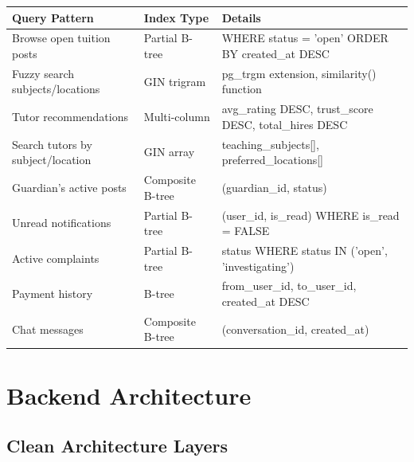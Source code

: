 \documentclass[12pt,a4paper,twoside]{report}
\begin{document}
\begin{longtable}{p{4cm}|p{2.5cm}|p{7cm}}
\toprule
\textbf{Query Pattern} & \textbf{Index Type} & \textbf{Details} \\
\midrule
\endhead
\bottomrule
\endfoot
Browse open tuition posts          & Partial B-tree   & WHERE status = 'open' ORDER BY created\_at DESC \\
Fuzzy search subjects/locations    & GIN trigram       & pg\_trgm extension, similarity() function \\
Tutor recommendations              & Multi-column      & avg\_rating DESC, trust\_score DESC, total\_hires DESC \\
Search tutors by subject/location  & GIN array         & teaching\_subjects[], preferred\_locations[] \\
Guardian's active posts            & Composite B-tree  & (guardian\_id, status) \\
Unread notifications               & Partial B-tree    & (user\_id, is\_read) WHERE is\_read = FALSE \\
Active complaints                  & Partial B-tree    & status WHERE status IN ('open', 'investigating') \\
Payment history                    & B-tree            & from\_user\_id, to\_user\_id, created\_at DESC \\
Chat messages                      & Composite B-tree  & (conversation\_id, created\_at) \\
\bottomrule
\end{longtable}

\chapter{Backend Architecture}

\section{Clean Architecture Layers}
\end{document}
